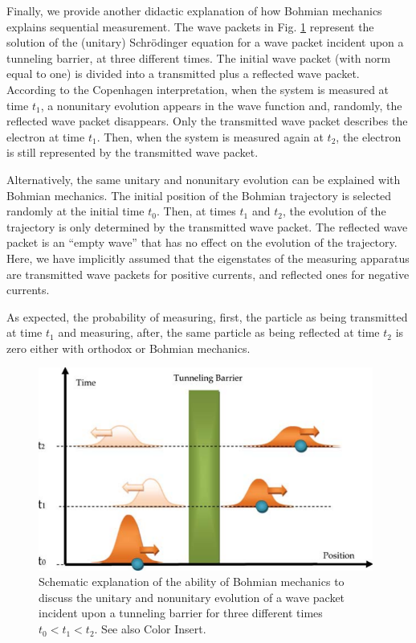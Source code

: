 \documentclass[onecolumn,nofootinbib, secnumarabic, amsmath, nobibnotes,12pt,aps,pra]{revtex4-1}
\newcommand{\fref}[1]{Fig. \ref{#1}}
\begin{document}
Finally, we provide another didactic explanation of how Bohmian
mechanics explains sequential measurement. The wave packets in
\fref{om_sequential} represent the solution of the (unitary)
Schr\"odinger equation for a wave packet incident upon a tunneling
barrier, at three different times. The initial wave packet (with norm
equal to one) is divided into a transmitted plus a reflected wave
packet. According to the Copenhagen interpretation, when the system
is measured at time $t_1$, a nonunitary evolution appears in the
wave function and, randomly, the reflected wave packet disappears.
Only the transmitted wave packet describes the electron at time
$t_1$. Then, when the system is measured again at $t_2$, the
electron is still represented by the transmitted wave packet.\enlargethispage{13pt}


Alternatively, the same unitary and nonunitary evolution can be
explained with Bohmian mechanics. The initial position of the
Bohmian trajectory is selected randomly at the initial time $t_0$.
Then, at times $t_1$ and $t_2$, the evolution of the trajectory is
only determined by the transmitted wave packet. The reflected wave
packet is an ``empty wave'' that has no effect on the evolution of
the trajectory.  Here, we have implicitly assumed that the
eigenstates of the measuring apparatus are transmitted wave packets
for positive currents, and reflected ones for negative currents.

As expected, the probability of measuring, first, the particle as
being transmitted at time $t_1$ and measuring, after, the same
particle as being reflected at time $t_2$ is zero either with
orthodox or Bohmian mechanics.

\begin{figure}
\includegraphics[width=11cm]{ch1-11.pdf}
\caption{Schematic explanation of the ability of Bohmian mechanics to discuss the
unitary and nonunitary evolution of a wave packet incident upon a
tunneling barrier for three different times $t_0 < t_1 < t_2$. See also Color Insert.}
\label{om_sequential}\vspace*{-6pt}
\end{figure}
\end{document}
